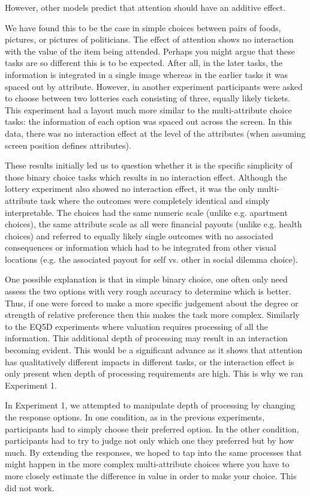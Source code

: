 \documentclass[doc, a4paper, apacite]{apa6}
\begin{document}
However, other models predict that attention should have an additive effect. 

We have found this to be the case in simple choices between pairs of foods, pictures, or pictures of politicians. 
The effect of attention shows no interaction with the value of the item being attended. 
Perhaps you might argue that these tasks are so different this is to be expected. 
After all, in the later tasks, the information is integrated in a single image whereas in the earlier tasks it was spaced out by attribute. 
However, in another experiment participants were asked to choose between two lotteries each consisting of three, equally likely tickets. 
This experiment had a layout much more similar to the multi-attribute choice tasks: the information of each option was spaced out across the screen. 
In this data, there was no interaction effect at the level of the attributes (when assuming screen position defines attributes). 

These results initially led us to question whether it is the specific simplicity of those binary choice tasks which results in no interaction effect. 
Although the lottery experiment also showed no interaction effect, it was the only multi-attribute task where the outcomes were completely identical and simply interpretable. 
The choices had the same numeric scale (unlike e.g. apartment choices), the same attribute scale as all were financial payouts (unlike e.g. health choices) and referred to equally likely single outcomes with no associated consequences or information which had to be integrated from other visual locations (e.g. the associated payout for self vs. other in social dilemma choice).

One possible explanation is that in simple binary choice, one often only need assess the two options with very rough accuracy to determine which is better. 
Thus, if one were forced to make a more specific judgement about the degree or strength of relative preference then this makes the task more complex. 
Similarly to the EQ5D experiments where valuation requires processing of all the information. 
This additional depth of processing may result in an interaction becoming evident. 
This would be a significant advance as it shows that attention has qualitatively different impacts in different tasks, or the interaction effect is only present when depth of processing requirements are high. 
This is why we ran Experiment 1. 

In Experiment 1, we attempted to manipulate depth of processing by changing the response options. 
In one condition, as in the previous experiments, participants had to simply choose their preferred option. 
In the other condition, participants had to try to judge not only which one they preferred but by how much. 
By extending the responses, we hoped to tap into the same processes that might happen in the more complex multi-attribute choices where you have to more closely estimate the difference in value in order to make your choice. 
This did not work. 
\end{document}
